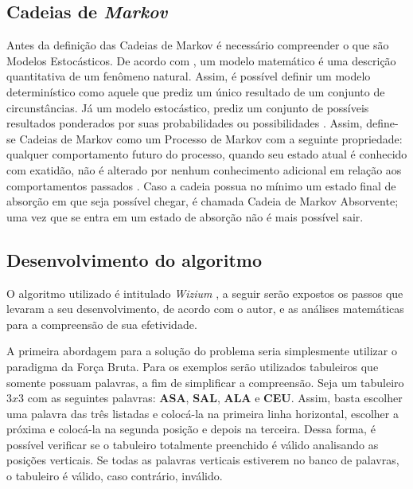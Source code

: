 
\subsection{Cadeias de \textit{Markov}}
Antes da definição das Cadeias de Markov é necessário compreender o que são Modelos Estocásticos. De acordo com \cite{howard1998introduction}, um modelo matemático é uma descrição quantitativa de um fenômeno natural. Assim, é possível definir um modelo determinístico como aquele que prediz um único resultado de um conjunto de circunstâncias. Já um modelo estocástico, prediz um conjunto de possíveis resultados ponderados por suas probabilidades ou possibilidades \citep{howard1998introduction}. Assim, define-se Cadeias de Markov como um Processo de Markov com a seguinte propriedade: qualquer comportamento futuro do processo, quando seu estado atual é conhecido com exatidão, não é alterado por nenhum conhecimento adicional em relação aos comportamentos passados \citep{howard1998introduction}. Caso a cadeia possua no mínimo um estado final de absorção em que seja possível chegar, é chamada Cadeia de Markov Absorvente; uma vez que se entra em um estado de absorção não é mais possível sair. 



\subsection{Desenvolvimento do algoritmo}
O algoritmo utilizado é intitulado \textit{Wizium} \citep{wizium}, a seguir serão expostos os passos que levaram a seu desenvolvimento, de acordo com o autor, e as análises matemáticas para a compreensão de sua efetividade.

A primeira abordagem para a solução do problema seria simplesmente utilizar o paradigma da Força Bruta. Para os exemplos serão utilizados tabuleiros que somente possuam palavras, a fim de simplificar a compreensão. Seja um tabuleiro $3x3$ com as seguintes palavras: \textbf{ASA}, \textbf{SAL}, \textbf{ALA} e \textbf{CEU}. Assim, basta escolher uma palavra das três listadas e colocá-la na primeira linha horizontal, escolher a próxima e colocá-la na segunda posição e depois na terceira. Dessa forma, é possível verificar se o tabuleiro totalmente preenchido é válido analisando as posições verticais. Se todas as palavras verticais estiverem no banco de palavras, o tabuleiro é válido, caso contrário, inválido. 

